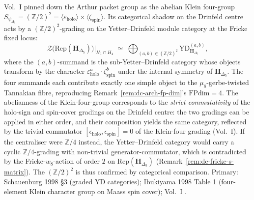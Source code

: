 \begin{remark}
\label{rem:dc-kazhdan-zz2x2-incarnation}
Vol.~I \cite{VolI} pinned down
the Arthur packet group as the abelian Klein four-group
$S_{\psi_{\Delta_5}} = (\mathbb Z/2)^2 =
\langle\varepsilon_{\mathrm{holo}}\rangle\times\langle\zeta_{\mathrm{spin}}\rangle$.
Its categorical shadow on the Drinfeld centre acts by a
$(\mathbb Z/2)^2$-grading on the Yetter--Drinfeld module category at
the Fricke fixed locus:
\begin{equation}
\label{eq:dc-kazhdan-yd-grading}
 \mathcal Z\!\bigl(\mathrm{Rep}(\mathbf H_{\Delta_5})\bigr)\big|_{H_1\cap H_4}
 \;\simeq\;
 \bigoplus_{(a,b)\in(\mathbb Z/2)^2}
 \mathrm{YD}^{(a,b)}_{\mathbf H_{\Delta_5}},
\end{equation}
where the $(a,b)$-summand is the sub-Yetter--Drinfeld category whose
objects transform by the character
$\varepsilon_{\mathrm{holo}}^a\cdot\zeta_{\mathrm{spin}}^b$ under the
internal symmetry of $\mathbf H_{\Delta_5}$. The four summands each
contribute exactly one simple object to the $\mu_8$-gerbe-twisted
Tannakian fibre, reproducing
Remark~\ref{rem:dc-arch-fp-dim}'s
$\mathrm{FPdim} = 4$. The abelianness of the Klein-four-group
corresponds to the \emph{strict commutativity} of the holo-sign and
spin-cover gradings on the Drinfeld centre: the two gradings can be
applied in either order, and their composition yields the same
category, reflected by the trivial commutator $[\epsilon_{\mathrm{holo}},
\epsilon_{\mathrm{spin}}] = 0$ of the Klein-four grading
(Vol.~I). If the
centraliser were $\mathbb Z/4$ instead, the Yetter--Drinfeld category
would carry a cyclic $\mathbb Z/4$-grading with non-trivial
generator-commutator, which is contradicted by the
Fricke-$w_8$-action of order $2$ on $\mathrm{Rep}(\mathbf H_{\Delta_5})$
(Remark~\ref{rem:dc-fricke-s-matrix}). The $(\mathbb Z/2)^2$
is thus confirmed by categorical comparison. Primary:
Schauenburg 1998 \S3 (graded YD
categories);
Ibukiyama 1998 Table 1 (four-element Klein
character group on Maass spin cover);
Vol.~I \cite{VolI}.
\end{remark}

